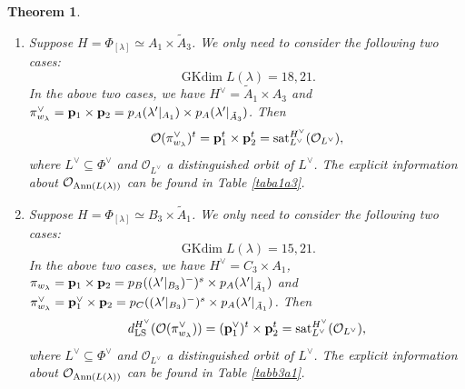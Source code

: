 \documentclass[reqno,12pt]{amsart}
\numberwithin{equation}{section}
\theoremstyle{plain}
\newtheorem{Thm}{Theorem}[section]
\theoremstyle{definition}
\newcommand{\lam}{\lambda}
\newcommand{\Ann}{\mathrm{Ann}}
\renewcommand{\subset}{\subseteq}
\newcommand{\gkd}{\operatorname{GKdim}}
\begin{document}
\begin{Thm}
\begin{enumerate}






  \item Suppose $H=\Phi_{[\lam]}\simeq A_1\times \tilde{A}_3$. We only need to consider the following two cases:
$$\gkd L(\lam)=18, 21.$$
In the above two cases, we have $H^{\vee}=\tilde{A}_1 \times A_3$ and 
$\pi^{\vee}_{w_{\lam}}={\bf p}_{1}\times {\bf p}_{2}=p_{A}(\lam'|_{A_1})\times p_{A}(\lam'|_{\tilde{A}_3})$. Then $$\mathcal{O}(\pi^{\vee}_{w_{\lam}})^t={\bf p}^t_{1}\times {\bf p}^t_{2} = {\rm sat}_{L^\vee}^{H^\vee} (\mathcal{O}_{L^\vee}),$$
where $L^\vee \subset \Phi^\vee$ and $\mathcal{O}_{L^\vee}$ a distinguished orbit of $L^\vee$. The explicit information about $\mathcal{O}_{{\rm Ann}(L(\lambda))}$ can be found in Table \ref{taba1a3}.





    
  







    
    
    \item Suppose $H=\Phi_{[\lam]}\simeq B_3\times \tilde{A}_1$. We only need to consider the following two cases:
$$\gkd L(\lam)=15, 21.$$
In the above two cases, we have $H^{\vee}={C}_3 \times A_1$, 
$\pi_{w_{\lam}}={\bf p}_{1}\times {\bf p}_{2}=p_{B}((\lam'|_{B_3})^-)^s\times p_{A}(\lam'|_{\tilde{A}_1})$ and $\pi^{\vee}_{w_{\lam}}={\bf p}^{\vee}_{1}\times {\bf p}_{2}=p_{C}((\lam'|_{B_3})^-)^s\times p_{A}(\lam'|_{\tilde{A}_1})$. Then $$d_{\rm LS}^{H^\vee}(\mathcal{O}(\pi^{\vee}_{w_{\lam}}))=({\bf p}^{\vee}_{1})^t\times {\bf p}^t_{2} = {\rm sat}_{L^\vee}^{H^\vee} (\mathcal{O}_{L^\vee}),$$
where $L^\vee \subset \Phi^\vee$ and $\mathcal{O}_{L^\vee}$ a distinguished orbit of $L^\vee$. The explicit information about $\mathcal{O}_{{\rm Ann}(L(\lambda))}$ can be found in Table \ref{tabb3a1}.


\end{enumerate}
\end{Thm}
\end{document}
